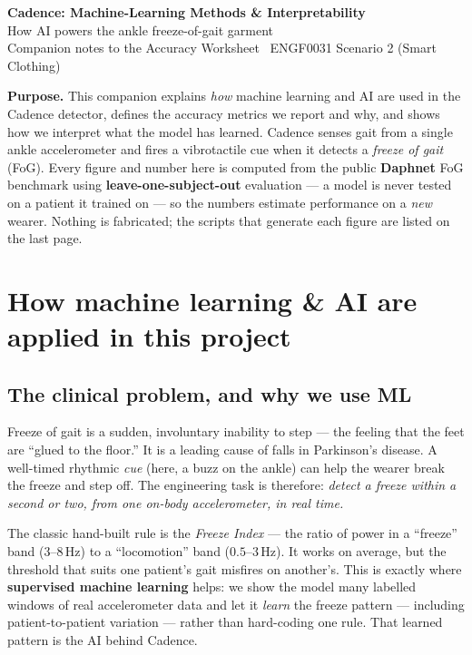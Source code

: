 \documentclass[11pt]{article}
\begin{document}
\begin{center}
  {\LARGE\bfseries\color{navy} Cadence: Machine-Learning Methods \& Interpretability}\\[4pt]
  {\large How AI powers the ankle freeze-of-gait garment}\\[6pt]
  {\color{mute}\small Companion notes to the Accuracy Worksheet \,\textbar\; ENGF0031 Scenario 2 (Smart Clothing)}
\end{center}

\vspace{2pt}
\noindent\textbf{Purpose.} This companion explains \emph{how} machine learning and AI are used in
the Cadence detector, defines the accuracy metrics we report and why, and shows
how we interpret what the model has learned. Cadence senses gait from a single
ankle accelerometer and fires a vibrotactile cue when it detects a
\emph{freeze of gait} (FoG). Every figure and number here is computed from the
public \textbf{Daphnet} FoG benchmark using \textbf{leave-one-subject-out}
evaluation --- a model is never tested on a patient it trained on --- so the
numbers estimate performance on a \emph{new} wearer. Nothing is fabricated; the
scripts that generate each figure are listed on the last page.

\section{How machine learning \& AI are applied in this project}

\subsection{The clinical problem, and why we use ML}
Freeze of gait is a sudden, involuntary inability to step --- the feeling that
the feet are ``glued to the floor.'' It is a leading cause of falls in
Parkinson's disease. A well-timed rhythmic \emph{cue} (here, a buzz on the
ankle) can help the wearer break the freeze and step off. The engineering task
is therefore: \emph{detect a freeze within a second or two, from one on-body
accelerometer, in real time.}

The classic hand-built rule is the \emph{Freeze Index} --- the ratio of power in
a ``freeze'' band ($3$--$8$\,Hz) to a ``locomotion'' band ($0.5$--$3$\,Hz). It
works on average, but the threshold that suits one patient's gait misfires on
another's. This is exactly where \textbf{supervised machine learning} helps: we
show the model many labelled windows of real accelerometer data and let it
\emph{learn} the freeze pattern --- including patient-to-patient variation ---
rather than hard-coding one rule. That learned pattern is the AI behind Cadence.
\end{document}
